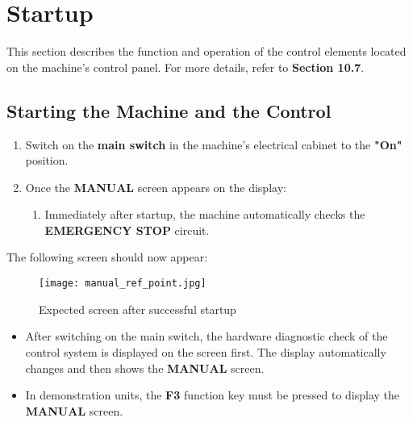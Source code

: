 \chapter{Startup}

This section describes the function and operation of the control elements located on the machine’s control panel. For more details, refer to \textbf{Section 10.7}.

\section{Starting the Machine and the Control}

\begin{enumerate}
    \item Switch on the \textbf{main switch} in the machine's electrical cabinet to the \textbf{"On"} position.
    
    \item Once the \textbf{MANUAL} screen appears on the display:
    \begin{enumerate}
        \item Immediately after startup, the machine automatically checks the \textbf{EMERGENCY STOP} circuit.
        \vspace{.5cm}
    \end{enumerate}
\end{enumerate}

\noindent The following screen should now appear:

\begin{figure}[h]
    \centering
    \texttt{[image: manual\_ref\_point.jpg]}
    \caption{Expected screen after successful startup}
\end{figure}

\notes

\begin{itemize}
    \item After switching on the main switch, the hardware diagnostic check of the control system is displayed on the screen first. The display automatically changes and then shows the \textbf{MANUAL} screen.
    \item In demonstration units, the \textbf{F3} function key must be pressed to display the \textbf{MANUAL} screen.
\end{itemize}

